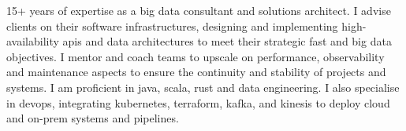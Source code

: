 

\begin{cvparagraph}

15+ years of expertise as a big data consultant and solutions architect.
I advise clients on their software infrastructures, designing and implementing high-availability apis and data architectures to meet their strategic fast and big data objectives.
I mentor and coach teams to upscale on performance, observability and maintenance aspects to ensure the continuity and stability of projects and systems.
I am proficient in java, scala, rust and data engineering.
I also specialise in devops, integrating kubernetes, terraform, kafka, and kinesis to deploy cloud and on-prem systems and pipelines.
\end{cvparagraph}
